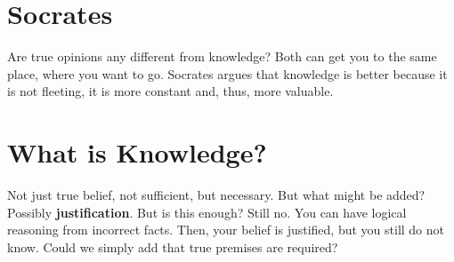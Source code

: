 \documentclass{article}
\begin{document}
\section{Socrates}

Are true opinions any different from knowledge? Both can get you to the same
place, where you want to go. Socrates argues that knowledge is better because it
is not fleeting, it is more constant and, thus, more valuable.

\section{What is Knowledge?}

Not just true belief, not sufficient, but necessary. But what might be added?
Possibly \textbf{justification}. But is this enough? Still no. You can have
logical reasoning from incorrect facts. Then, your belief is justified, but you
still do not know. Could we simply add that true premises are required?
\end{document}
